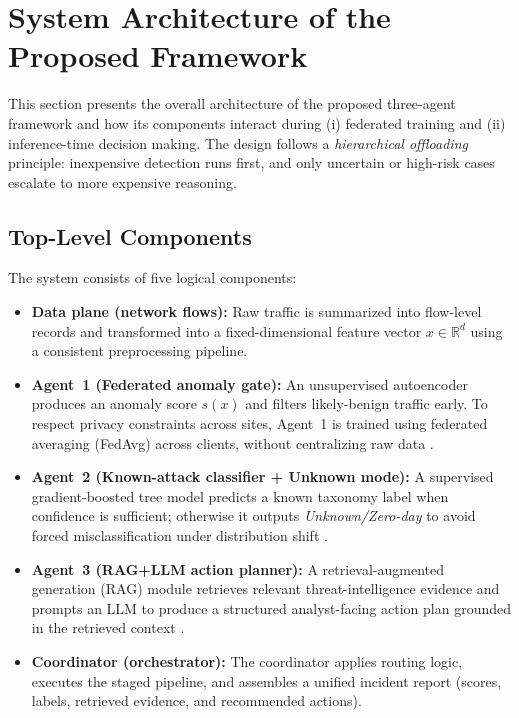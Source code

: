 %
%

\section{System Architecture of the Proposed Framework}
\label{sec:system_architecture}

This section presents the overall architecture of the proposed three-agent framework and how its components interact during (i) federated training and (ii) inference-time decision making. The design follows a \emph{hierarchical offloading} principle: inexpensive detection runs first, and only uncertain or high-risk cases escalate to more expensive reasoning.

\subsection{Top-Level Components}
The system consists of five logical components:
\begin{itemize}
  \item \textbf{Data plane (network flows):} Raw traffic is summarized into flow-level records and transformed into a fixed-dimensional feature vector $x\in\mathbb{R}^d$ using a consistent preprocessing pipeline.
  \item \textbf{Agent~1 (Federated anomaly gate):} An unsupervised autoencoder produces an anomaly score $s(x)$ and filters likely-benign traffic early. To respect privacy constraints across sites, Agent~1 is trained using federated averaging (FedAvg) across clients, without centralizing raw data \cite{mcmahan2017fedavg,kairouz2021flsurvey}.
  \item \textbf{Agent~2 (Known-attack classifier + Unknown mode):} A supervised gradient-boosted tree model predicts a known taxonomy label when confidence is sufficient; otherwise it outputs \emph{Unknown/Zero-day} to avoid forced misclassification under distribution shift \cite{chen2016xgboost,scheirer2013openset,bendale2016openmax}.
  \item \textbf{Agent~3 (RAG+LLM action planner):} A retrieval-augmented generation (RAG) module retrieves relevant threat-intelligence evidence and prompts an LLM to produce a structured analyst-facing action plan grounded in the retrieved context \cite{lewis2020rag,nist80061,mitreattack,mitrecve}.
  \item \textbf{Coordinator (orchestrator):} The coordinator applies routing logic, executes the staged pipeline, and assembles a unified incident report (scores, labels, retrieved evidence, and recommended actions).
\end{itemize}

